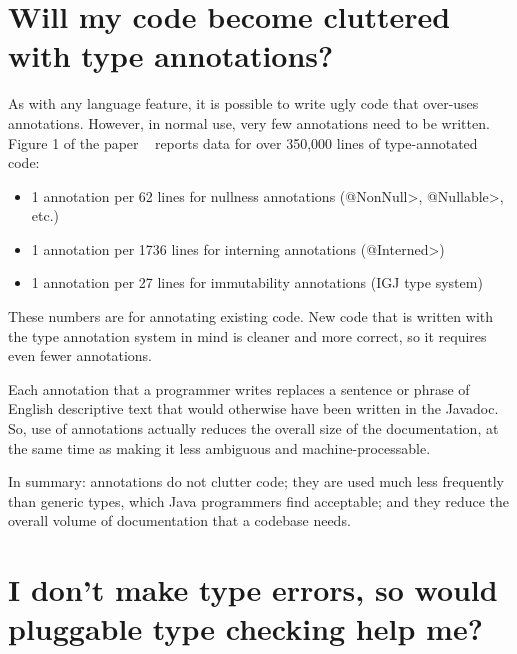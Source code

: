 \section{Will my code become cluttered with type annotations?\label{faq-code-clutter}}


As with any language feature, it is possible to write ugly code that
over-uses annotations.  However, in normal use, very few annotations need
to be written.  Figure 1 of the paper
~\cite{PapiACPE2008} reports data for over
350,000 lines of type-annotated code:

\begin{itemize}
\item
    1 annotation per 62 lines for nullness annotations (\<@NonNull>, \<@Nullable>, etc.)
\item
    1 annotation per 1736 lines for interning annotations (\<@Interned>)
\item
    1 annotation per 27 lines for immutability annotations (IGJ type system)
\end{itemize}

These numbers are for annotating existing code.  New code that
is written with the type annotation system in mind is cleaner and more
correct, so it requires even fewer annotations.

Each annotation that a programmer writes replaces a sentence or phrase of
English descriptive text that would otherwise have been written in the
Javadoc.  So, use of annotations actually reduces the overall size of the
documentation, at the same time as making it less ambiguous and
machine-processable.

In summary:  annotations do not clutter code; they are used much
less frequently than generic types, which Java programmers find acceptable;
and they reduce the overall volume of documentation that a codebase needs.


\section{I don't make type errors, so would pluggable type checking help me?\label{never-make-type-errors}}

